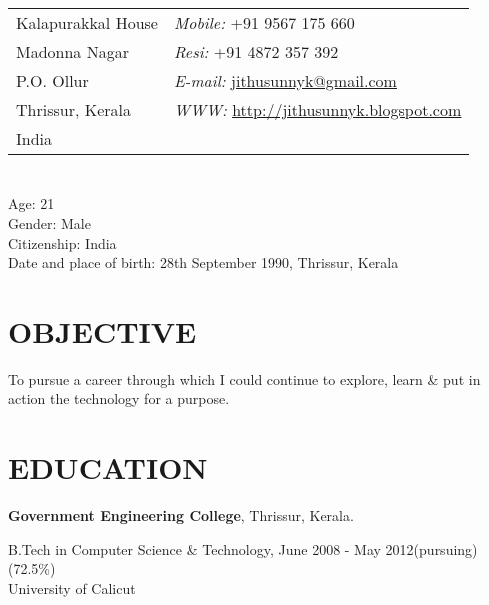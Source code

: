\begin{resume}


\section{}
\vspace{.05in}
\begin{tabular}{@{}p{2in}p{4in}}
Kalapurakkal House   & {\it Mobile:}  +91 9567 175 660 \\
Madonna Nagar   & {\it Resi:}    +91 4872 357 392   \\
P.O. Ollur & {\it E-mail:}
\href{mailto:jithusunnyk@gmail.com}{\underline{jithusunnyk@gmail.com}}
\\
Thrissur, Kerala  & {\it WWW:}
\href{http://jithusunnyk.blogspot.com}{\underline{http://jithusunnyk.blogspot.com}}
 \\
India
\end{tabular}

\vspace*{+2mm}
\section{}
Age: 21\\
Gender: Male\\
Citizenship: India\\
Date and place of birth: 28th September 1990, Thrissur, Kerala \\

\vspace*{+2mm}

\section{\bf \textsf{OBJECTIVE}}
To pursue a career through which I could continue to explore, learn \& put in action the technology for a purpose.

\vspace*{+2mm}

\section{\bf \textsf{EDUCATION}}
{\bf \textsf{Government Engineering College}}, Thrissur, Kerala.\\
\vspace*{-.1in}

\begin{list1}
\item[] B.Tech in Computer Science \& Technology, June 2008 - May 2012(pursuing)  \qquad (72.5\%)\\ University of Calicut 
\end{list1}


\end{resume}
